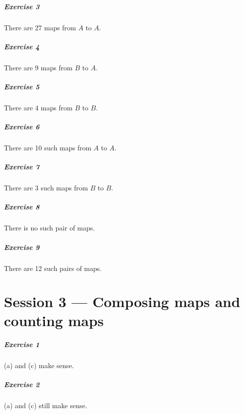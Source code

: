 \documentclass{report}
\begin{document}
    \paragraph{Exercise 3}
    There are 27 maps from $A$ to $A$.

    \paragraph{Exercise 4}
    There are 9 maps from $B$ to $A$.

    \paragraph{Exercise 5}
    There are 4 maps from $B$ to $B$.

    \paragraph{Exercise 6}
    There are 10 such maps from $A$ to $A$.

    \paragraph{Exercise 7}
    There are 3 such maps from $B$ to $B$.

    \paragraph{Exercise 8}
    There is no such pair of maps.

    \paragraph{Exercise 9}
    There are 12 such pairs of maps.

    \chapter{Session 3 --- Composing maps and counting maps}

    \paragraph{Exercise 1}
    (a) and (c) make sense.

    \paragraph{Exercise 2}
    (a) and (c) still make sense.
\end{document}
